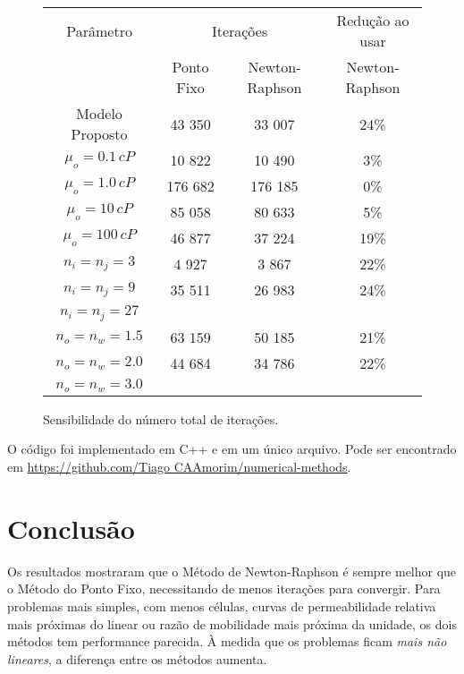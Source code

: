 \documentclass[final,5p]{elsarticle}
\numberwithin{equation}{section}
\begin{document}
        \begin{figure*}
            \caption{Sensibilidade do número total de iterações.}
            \label{tab:sens}
            \begin{center}
                \renewcommand{\arraystretch}{1.2}
                \begin{tabular}{c|cc|c}
                    Parâmetro & \multicolumn{2}{c|}{Iterações}  & Redução ao usar \\
                            & Ponto Fixo      & Newton-Raphson & Newton-Raphson \\
                    \hline
                    Modelo Proposto & 43 350 & 33 007 & 24\% \\
                    \hline
                    $\mu_o = 0.1\,cP$ & 10 822 & 10 490 & 3\% \\
                    $\mu_o = 1.0\,cP$ & 176 682 & 176 185  & 0\% \\
                    $\mu_o = 10\,cP$ & 85 058 & 80 633 & 5\% \\
                    $\mu_o = 100\,cP$ & 46 877 & 37 224 & 19\% \\
                    \hline
                    $n_i = n_j = 3$ & 4 927 & 3 867 & 22\% \\
                    $n_i = n_j = 9$ & 35 511 & 26 983 & 24\% \\
                    $n_i = n_j = 27$ &  &  & \\
                    \hline
                    $n_o = n_w = 1.5$ & 63 159 & 50 185 & 21\% \\
                    $n_o = n_w = 2.0$ & 44 684 & 34 786 & 22\% \\
                    $n_o = n_w = 3.0$ &  &  & \\
                \end{tabular}
            \end{center}
        \end{figure*}

        O código foi implementado em C++ e em um único arquivo. Pode ser encontrado em \href{https://github.com/TiagoCAAmorim/numerical-methods/blob/main/12_NewtonRaphson/12_NewtonRaphson.cpp}{https://github.com/Tiago CAAmorim/numerical-methods}.

\section{Conclusão}

            Os resultados mostraram que o Método de Newton-Raphson é sempre melhor que o Método do Ponto Fixo, necessitando de menos iterações para convergir. Para problemas mais simples, com menos células, curvas de permeabilidade relativa mais próximas do linear ou razão de mobilidade mais próxima da unidade, os dois métodos tem performance parecida. À medida que os problemas ficam \emph{mais não lineares}, a diferença entre os métodos aumenta.
\end{document}
